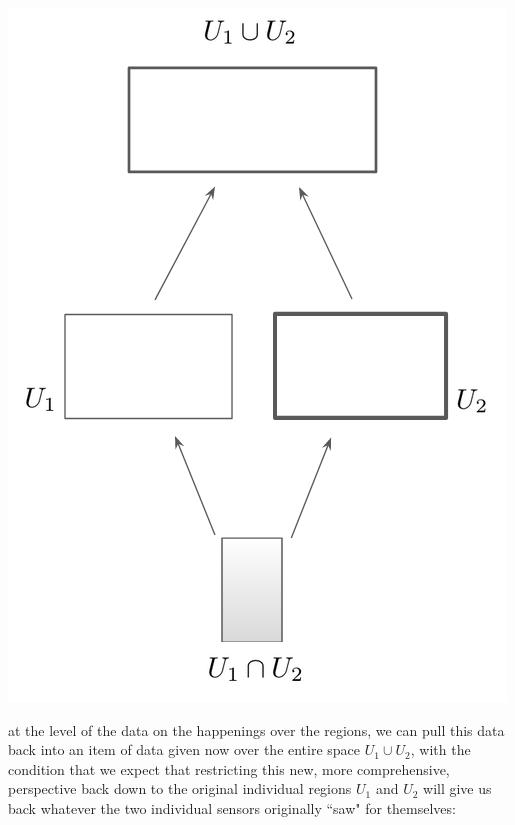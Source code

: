 \documentclass[11pt]{book}
\theoremstyle{definition}
\theoremstyle{definition}
\theoremstyle{definition}
\theoremstyle{theorem}
\theoremstyle{definition}
\begin{document}
	\begin{center}
		\includegraphics[scale=0.25]{UnderlyingSpaceDiagram.png}
	\end{center}
	at the level of the data on the happenings over the regions, we can pull this data back into an item of data given now over the entire space $U_1 \cup U_2$, with the condition that we expect that restricting this new, more comprehensive, perspective back down to the original individual regions $U_1$ and $U_2$ will give us back whatever the two individual sensors originally ``saw" for themselves: 
\end{document}
